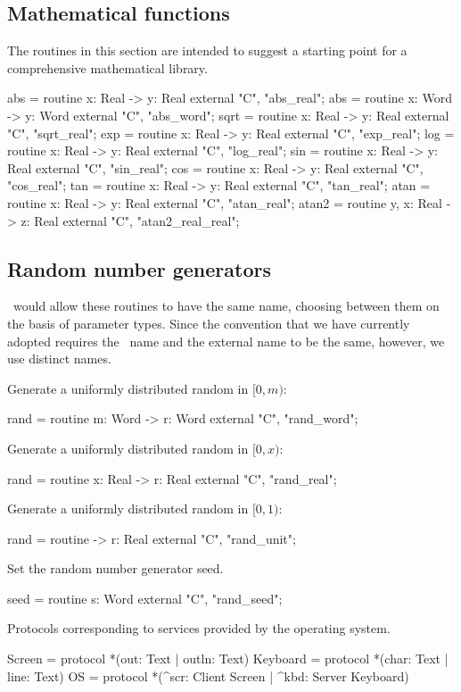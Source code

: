 \documentclass{scrartcl}
\begin{document}
\subsection{Mathematical functions}

The routines in this section are intended to suggest a starting point for a comprehensive mathematical library.
\begin{code}
abs = routine x: Real -> y: Real external "C", "abs_real";
abs = routine x: Word -> y: Word external "C", "abs_word";
sqrt = routine x: Real -> y: Real external "C", "sqrt_real";
exp = routine x: Real -> y: Real external "C", "exp_real";
log = routine x: Real -> y: Real external "C", "log_real";
sin = routine x: Real -> y: Real external "C", "sin_real";
cos = routine x: Real -> y: Real external "C", "cos_real";
tan = routine x: Real -> y: Real external "C", "tan_real";
atan = routine x: Real -> y: Real external "C", "atan_real";
atan2 = routine y, x: Real -> z: Real external "C", "atan2_real_real";
\end{code}

\subsection{Random number generators}

\desi\ would allow these routines to have the same name, choosing between them on the basis of parameter types.  Since the convention that we have currently adopted requires the \desi\ name and the external name to be the same, however, we use distinct names.

Generate a uniformly distributed random  in $[0,m)$:
\begin{code}
rand = routine m: Word -> r: Word external "C", "rand_word";
\end{code}

Generate a uniformly distributed random  in $[0,x)$:
\begin{code}
rand = routine x: Real -> r: Real external "C", "rand_real";
\end{code}

Generate a uniformly distributed random  in $[0,1)$:
\begin{code}
rand = routine -> r: Real external "C", "rand_unit";
\end{code}

Set the random number generator seed.
\begin{code}
seed = routine s: Word external "C", "rand_seed"; 
\end{code}

Protocols corresponding to services provided by the operating system.
\begin{code}
Screen = protocol { *(out: Text | outln: Text) }
Keyboard = protocol { *(char: Text | line: Text) }
OS = protocol {*(^scr: Client Screen | ^kbd: Server Keyboard) }
\end{code}
\end{document}
